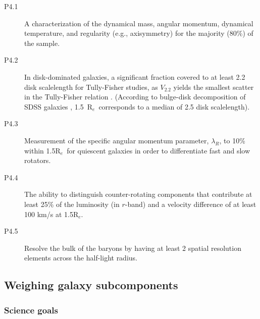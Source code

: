 \documentclass[preprint,11pt]{aastex}
\newcommand{\Reff}{{R$_{e}$}}
\begin{document}
\begin{description}
\item [P4.1] A characterization of the dynamical mass, angular momentum,
  dynamical temperature, and regularity (e.g., axisymmetry) for the majority (80\%) of the sample.

\item [P4.2] In disk-dominated galaxies, a significant fraction covered to at least 2.2 disk scalelength for Tully-Fisher studies, as $V_{2.2}$ yields the smallest scatter in the Tully-Fisher relation \citep{courteau97}. (According to bulge-disk decomposition of SDSS galaxies \citep{lackner12a}, 1.5~\Reff\ corresponds to a median of 2.5 disk scalelength).

\item [P4.3] Measurement of the specific angular momentum parameter, $\lambda_R$, to 10\% within 1.5\Reff\ for quiescent galaxies in order to
  differentiate fast and slow rotators.


\item [P4.4] The ability to distinguish counter-rotating components
  that contribute at least 25\% of the luminosity (in $r$-band) and a
  velocity difference of at least 100 km/s at 1.5\Reff.

\item [P4.5] Resolve the bulk of the baryons by having at least 2
  spatial resolution elements across the half-light radius.


\end{description}

\subsection{Weighing galaxy subcomponents}
\label{sec:weighing}

\subsubsection{Science goals}
\end{document}
